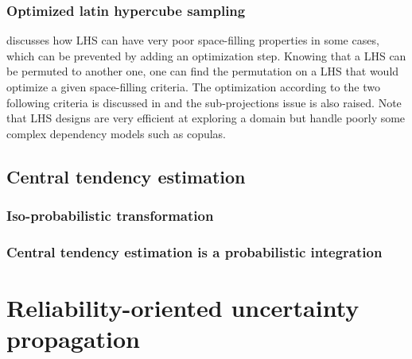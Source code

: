 \subsubsection{Optimized latin hypercube sampling}

\cite{franco_2008} discusses how LHS can have very poor space-filling properties in some cases, which can be prevented by adding an optimization step. 
Knowing that a LHS can be permuted to another one, one can find the permutation on a LHS that would optimize a given space-filling criteria. 
The optimization according to the two following criteria is discussed in \cite{damblin_couplet_2013} and the sub-projections issue is also raised. 
Note that LHS designs are very efficient at exploring a domain but handle poorly some complex dependency models such as copulas.


\subsection{Central tendency estimation}
\subsubsection{Iso-probabilistic transformation}

\subsubsection{Central tendency estimation is a probabilistic integration}



\section{Reliability-oriented uncertainty propagation}

